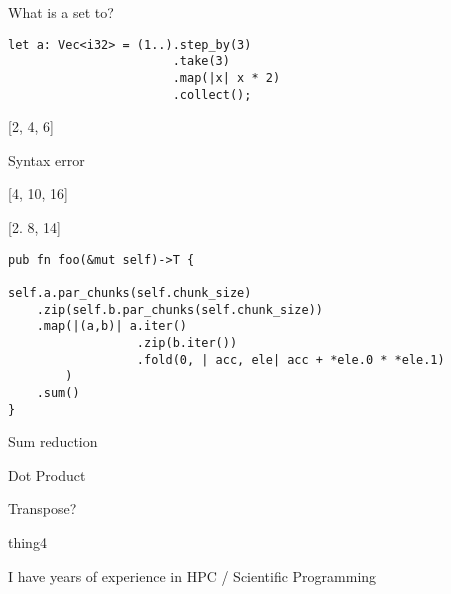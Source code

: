 \documentclass[11pt]{article} %
\newcommand*\choice{\item}
\begin{document}
\begin{multiplechoice}[choices=1]
  What is a set to?

  \begin{lstlisting}
let a: Vec<i32> = (1..).step_by(3)
                       .take(3)
                       .map(|x| x * 2)
                       .collect();
  \end{lstlisting}

  \choice {[2, 4, 6]}
  \choice Syntax error
  \choice {[4, 10, 16]}
  \choice {[2. 8, 14]}
\end{multiplechoice}

\begin{multiplechoice}[choices=1]

\begin{lstlisting}
pub fn foo(&mut self)->T {

self.a.par_chunks(self.chunk_size)
    .zip(self.b.par_chunks(self.chunk_size))
    .map(|(a,b)| a.iter()
                  .zip(b.iter())
                  .fold(0, | acc, ele| acc + *ele.0 * *ele.1)
        )
    .sum()
}
\end{lstlisting}

\choice Sum reduction
\choice Dot Product
\choice Transpose?
\choice thing4

\end{multiplechoice}

\begin{exercise}
I have \blank{}  years of experience in HPC / Scientific Programming
\end{exercise}
\end{document}
